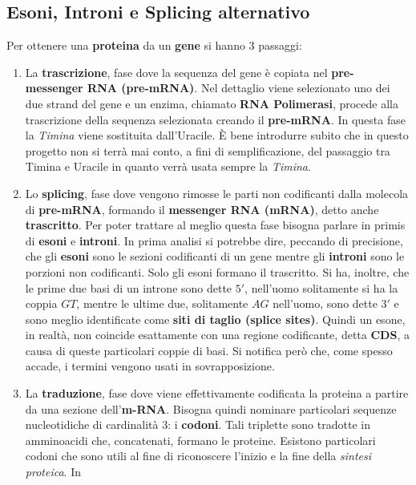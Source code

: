 \documentclass[a4paper,12pt, oneside]{book}
\begin{document}
\begin{shaded}
  \subsection{Esoni, Introni e Splicing alternativo}
  Per ottenere una \textbf{proteina} da un \textbf{gene} si hanno 3 passaggi:
  \begin{enumerate}
    \item La \textbf{trascrizione}, fase dove la sequenza del gene è copiata
    nel \textbf{pre-messenger RNA (pre-mRNA)}. Nel dettaglio viene selezionato
    uno 
    dei due strand del gene e un enzima, chiamato \textbf{RNA Polimerasi},
    procede 
    alla trascrizione della sequenza selezionata creando il
    \textbf{pre-mRNA}. In
    questa fase la \textit{Timina} viene sostituita dall'Uracile. È bene
    introdurre subito che in questo progetto non si terrà mai conto, a fini di
    semplificazione, del passaggio tra Timina e Uracile in quanto verrà usata
    sempre la \textit{Timina}.
    \item Lo \textbf{splicing}, fase dove vengono rimosse le parti non
    codificanti 
    dalla molecola di \textbf{pre-mRNA}, formando il \textbf{messenger RNA
      (mRNA)},
    detto anche \textbf{trascritto}. Per poter trattare al meglio questa fase
    bisogna parlare in primis di \textbf{esoni} e \textbf{introni}. In prima
    analisi si potrebbe dire, peccando di precisione, che gli
    \textbf{esoni} sono le sezioni codificanti di un gene mentre gli
    \textbf{introni} sono le porzioni non codificanti. Solo gli esoni formano il
    trascritto. Si ha, inoltre, che le prime due basi di un introne sono dette
    $5'$, nell'uomo solitamente si ha la coppia $GT$, mentre le ultime due,
    solitamente $AG$ nell'uomo, sono
    dette $3'$ e sono meglio identificate come \textbf{siti di taglio (splice
      sites)}. 
    Quindi un esone, in realtà, non coincide esattamente con una regione
    codificante, detta \textbf{CDS}, a causa di queste particolari coppie di
    basi. Si notifica però che, come spesso accade, i termini vengono usati in
    sovrapposizione. 
    \item La \textbf{traduzione}, fase dove viene effettivamente codificata la
    proteina a partire da una sezione dell'\textbf{m-RNA}. 
    Bisogna quindi nominare particolari sequenze nucleotidiche di cardinalità 3:
    i 
    \textbf{codoni}. Tali triplette sono tradotte in amminoacidi che,
    concatenati, 
    formano le proteine. Esistono particolari codoni che sono utili al fine
    di riconoscere l'inizio e la fine della \textit{sintesi proteica}. In

\end{enumerate}
\end{shaded}
\end{document}
